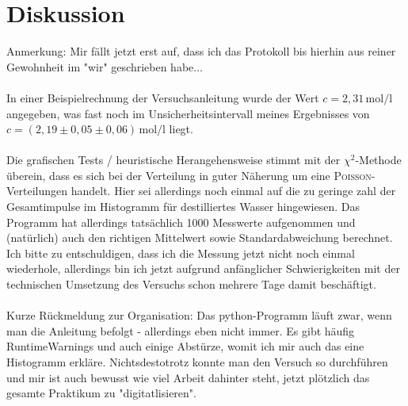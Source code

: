 \documentclass[a4paper,12pt]{article}
\begin{document}
\section{Diskussion}
Anmerkung: Mir fällt jetzt erst auf, dass ich das Protokoll bis hierhin aus reiner Gewohnheit im "wir" geschrieben habe... \\ \\
In einer Beispielrechnung der Versuchsanleitung wurde der Wert $c=2,31\,\mathrm{mol/l}$ angegeben, was fast noch im Unsicherheitsintervall meines Ergebnisses von $c=(2,19\pm 0,05\pm 0,06)\,\mathrm{mol/l}$ liegt. \\ \\
Die grafischen Tests / heuristische Herangehensweise stimmt mit der $\chi^2$-Methode überein, dass es sich bei der Verteilung in guter Näherung um eine \textsc{Poisson}-Verteilungen handelt. Hier sei allerdings noch einmal auf die zu geringe zahl der Gesamtimpulse im Histogramm für destilliertes Wasser hingewiesen. Das Programm hat allerdings tatsächlich 1000 Messwerte aufgenommen und (natürlich) auch den richtigen Mittelwert sowie Standardabweichung berechnet. Ich bitte zu entschuldigen, dass ich die Messung jetzt nicht noch einmal wiederhole, allerdings bin ich jetzt aufgrund anfänglicher Schwierigkeiten mit der technischen Umsetzung des Versuchs schon mehrere Tage damit beschäftigt.\\ \\
Kurze Rückmeldung zur Organisation: Das python-Programm läuft zwar, wenn man die Anleitung befolgt - allerdings eben nicht immer. Es gibt häufig RuntimeWarnings und auch einige Abstürze, womit ich mir auch das eine Histogramm erkläre. Nichtsdestotrotz konnte man den Versuch so durchführen und mir ist auch bewusst wie viel Arbeit dahinter steht, jetzt plötzlich das gesamte Praktikum zu "digitatlisieren". 

	
\end{document}
